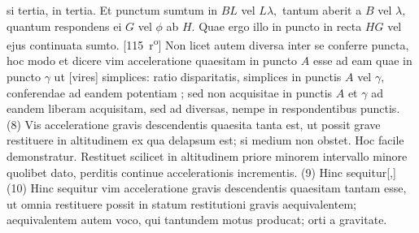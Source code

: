 si tertia, in tertia.
Et punctum sumtum
in $\displaystyle BL$ vel $\displaystyle L\lambda,$
tantum aberit a $\displaystyle B$ vel $\displaystyle \lambda,$
quantum respondens ei $\displaystyle G$ vel $\displaystyle \phi$ ab $\displaystyle H.$
Quae ergo illo in puncto in recta $\displaystyle HG$ vel ejus continuata sumto.
%
[115~r\textsuperscript{o}] %
%
Non licet autem diversa inter se conferre puncta, hoc modo
et dicere vim acceleratione\protect{}
quaesitam in puncto $\displaystyle A$ esse ad eam quae in puncto $\displaystyle\gamma$
ut [vires] simplices:
ratio disparitatis, 
simplices\protect{}
in punctis $\displaystyle A$ vel $\displaystyle\gamma,$
conferendae ad eandem potentiam
;
sed non acquisitae in punctis $\displaystyle A$ et $\displaystyle\gamma$
ad eandem  liberam acquisitam,
sed ad diversas, nempe in respondentibus punctis.
\pend
\pstart
(8)
Vis acceleratione\protect{}
gravis\protect{} descendentis quaesita
tanta est, ut possit grave restituere in altitudinem ex qua delapsum est;
si medium\protect{} non obstet.
Hoc facile demonstratur.
Restituet scilicet in altitudinem priore minorem intervallo minore quolibet dato,
perditis continue accelerationis incrementis.
\pend
\pstart
(9)
Hinc sequitur[,]
\pend
\pstart
(10)
Hinc sequitur vim acceleratione\protect{}
gravis\protect{} descendentis quaesitam
tantam esse, ut omnia restituere possit in statum
restitutioni\protect{} gravis aequivalentem;
aequivalentem autem voco,
qui tantundem motus producat;
orti a gravitate.\protect{}
